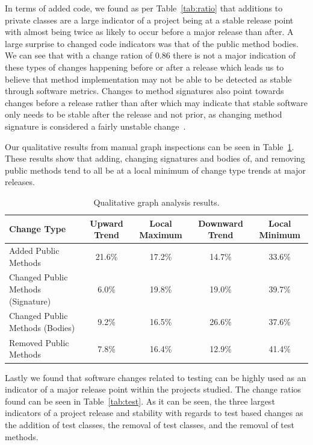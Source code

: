 \documentclass[conference]{IEEEtran}
\begin{document}
In terms of added code, we found as per Table~\ref{tab:ratio} that additions to private classes are a large indicator of a project being at a stable
release point with almost being twice as likely to occur before a major release than after. A large surprise to changed code indicators was that of the
public method bodies. We can see that with a change ration of 0.86 there is not a major indication of these types of changes happening before or after a 
release which leads us to believe that method implementation may not be able to be detected as stable through software metrics. Changes
to method signatures also point towards changes before a release rather than after which may indicate that stable software only needs to be stable after the
release and not prior, as changing method signature is considered a fairly unstable change~\cite{Fluri}.

Our qualitative results from manual graph inspections can be seen in Table~\ref{tab:qual}. These results show that adding, changing signatures and bodies of, and
removing public methods tend to all be at a local minimum of change type trends at major releases.

\begin{table}[h]
\begin{center}
\begin{tabular}{| l | c | c | c | c |}
\hline
Change Type & Upward Trend & Local Maximum & Downward Trend & Local Minimum\\
\hline
Added Public Methods & 21.6\% & 17.2\% & 14.7\% & 33.6\% \\
Changed Public Methods (Signature) & 6.0\% & 19.8\% & 19.0\% & 39.7\% \\
Changed Public Methods (Bodies) & 9.2\% & 16.5\% & 26.6\% & 37.6\% \\
Removed Public Methods & 7.8\% & 16.4\% & 12.9\% & 41.4\% \\
\hline
\end{tabular}
\end{center}
\caption{Qualitative graph analysis results. \label{tab:qual}}
\end{table}

Lastly we found that software changes related to testing can be highly used as an indicator of a major release point within the projects studied. The change
ratios found can be seen in Table~\ref{tab:test}. As it can be seen, the three largest indicators of a project release and stability with regards to test based
changes as the addition of test classes, the removal of test classes, and the removal of test methods.
\end{document}
